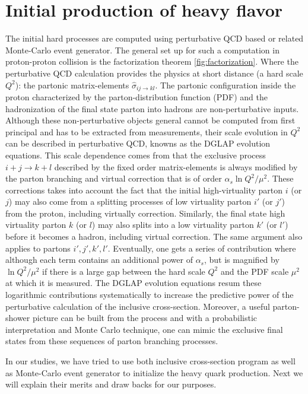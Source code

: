 \section{Initial production of heavy flavor}
The initial hard processes are computed using perturbative QCD based or related Monte-Carlo event generator.
The general set up for such a computation in proton-proton collision is the factorization theorem \ref{fig:factorization}.
Where the perturbative QCD calculation provides the physics at short distance (a hard scale $Q^2$): the partonic matrix-elements $\hat{\sigma}_{ij\rightarrow kl}$.
The partonic configuration inside the proton characterized by the parton-distribution function (PDF) and the hadronization of the final state parton into hadrons are non-perturbative inputs.
Although these non-perturbative objects general cannot be computed from first principal and has to be extracted from measurements, their scale evolution in $Q^2$ can be described in perturbative QCD, knowns as the DGLAP evolution equations.
This scale dependence comes from that the exclusive process  $i+j \rightarrow k+l$ described by the fixed order matrix-elements is always modified by the parton branching and virtual correction that is of order $\alpha_s \ln Q^2/\mu^2$.
These corrections takes into account the fact that the initial high-virtuality parton $i$ (or $j$) may also come from a splitting processes of low virtuality parton $i'$ (or $j'$) from the proton, including virtually correction. 
Similarly, the final state high virtuality parton $k$ (or $l$) may also splits into a low virtuality parton $k'$ (or $l'$) before it becomes a hadron, including virtual correction.
The same argument also applies to partons $i', j', k', l'$. 
Eventually, one gets a series of contribution where although each term contains an additional power of $\alpha_s$, but is magnified by $\ln Q^2/\mu^2$ if there is a large gap between the hard scale $Q^2$ and the PDF scale $\mu^2$ at which it is measured.
The DGLAP evolution equations resum these logarithmic contributions systematically to increase the predictive power of the perturbative calculation of the inclusive cross-section.
Moreover, a useful parton-shower picture can be built from the process and with a probabilistic interpretation and Monte Carlo technique, one can mimic the exclusive final states from these sequences of parton branching processes.

In our studies, we have tried to use both inclusive cross-section program as well as Monte-Carlo event generator to initialize the heavy quark production.
Next we will explain their merits and draw backs for our purposes.

